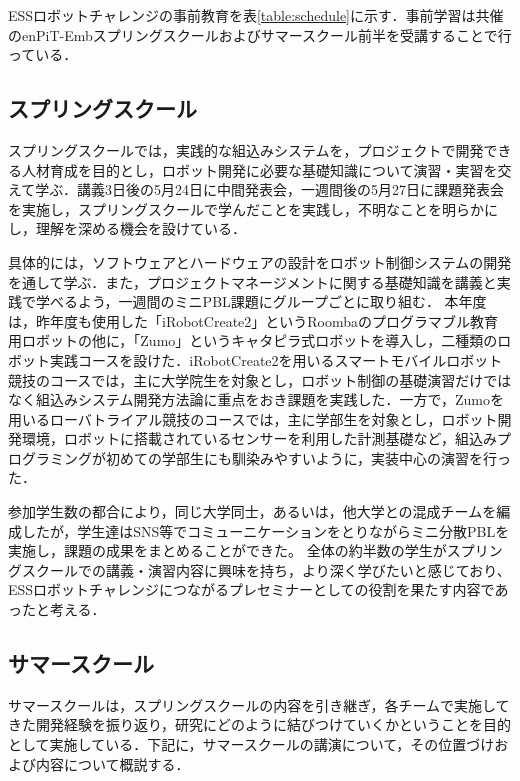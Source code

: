 \documentclass[submit]{ipsj}
\begin{document}
ESSロボットチャレンジの事前教育を表\ref{table:schedule}に示す．事前学習は共催のenPiT-Embスプリングスクールおよびサマースクール前半を受講することで行っている．

\subsection{スプリングスクール}

スプリングスクールでは，実践的な組込みシステムを，プロジェクトで開発できる人材育成を目的とし，ロボット開発に必要な基礎知識について演習・実習を交えて学ぶ．講義3日後の5月24日に中間発表会，一週間後の5月27日に課題発表会を実施し，スプリングスクールで学んだことを実践し，不明なことを明らかにし，理解を深める機会を設けている．

具体的には，ソフトウェアとハードウェアの設計をロボット制御システムの開発を通して学ぶ．また，プロジェクトマネージメントに関する基礎知識を講義と実践で学べるよう，一週間のミニPBL課題にグループごとに取り組む．
本年度は，昨年度も使用した「iRobotCreate2」というRoombaのプログラマブル教育用ロボットの他に，「Zumo」というキャタピラ式ロボットを導入し，二種類のロボット実践コースを設けた．iRobotCreate2を用いるスマートモバイルロボット競技のコースでは，主に大学院生を対象とし，ロボット制御の基礎演習だけではなく組込みシステム開発方法論に重点をおき課題を実践した．一方で，Zumoを用いるローバトライアル競技のコースでは，主に学部生を対象とし，ロボット開発環境，ロボットに搭載されているセンサーを利用した計測基礎など，組込みプログラミングが初めての学部生にも馴染みやすいように，実装中心の演習を行った．

参加学生数の都合により，同じ大学同士，あるいは，他大学との混成チームを編成したが，学生達はSNS等でコミューニケーションをとりながらミニ分散PBLを実施し，課題の成果をまとめることができた。
全体の約半数の学生がスプリングスクールでの講義・演習内容に興味を持ち，より深く学びたいと感じており、ESSロボットチャレンジにつながるプレセミナーとしての役割を果たす内容であったと考える．

\subsection{サマースクール}

サマースクールは，スプリングスクールの内容を引き継ぎ，各チームで実施してきた開発経験を振り返り，研究にどのように結びつけていくかということを目的として実施している．下記に，サマースクールの講演について，その位置づけおよび内容について概説する．
\end{document}
